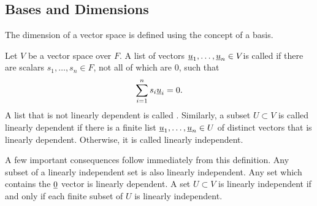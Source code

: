 \subsection{Bases and Dimensions}
\label{section:BasesAndDimensions}

The dimension of a vector space is defined using the concept of a basis.

\begin{definition}
Let $V$ be a vector space over $F$.
A list of vectors $\underline{u}_1, \ldots, \underline{u}_n \in V $is called  if there are scalars $s_1, \ldots, s_n \in F$, not all of which are $0$, such that
\begin{equation*}
\sum_{i=1}^n s_i \underline{u}_i = 0.
\end{equation*}
A list that is not linearly dependent is called .
Similarly, a subset $U \subset V$ is called linearly dependent if there is a finite list $\underline{u}_1, \ldots, \underline{u}_n \in U$ of distinct vectors that is linearly dependent.
Otherwise, it is called linearly independent.
\end{definition}

A few important consequences follow immediately from this definition.
Any subset of a linearly independent set is also linearly independent.
Any set which contains the $\underline{0}$ vector is linearly dependent.
A set $U \subset V$ is linearly independent if and only if each finite subset of $U$ is linearly independent.

\iffalse

